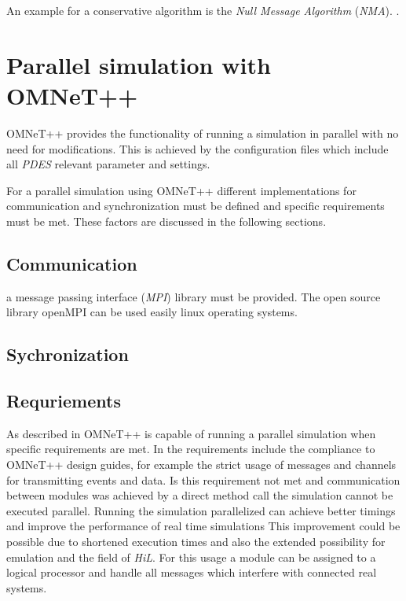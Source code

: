 An example for a conservative algorithm is the \emph{Null Message Algorithm} (\emph{NMA}). \cite[section 2.1]{bagrodia_performance_2000} \cite{Varga03apractical}.

\section{Parallel simulation with OMNeT++}
\label{sec:parallel_omnet}

OMNeT++ provides the functionality of running a simulation in parallel with no need for modifications.
This is achieved by the configuration files which include all \emph{PDES} relevant parameter and settings.

For a parallel simulation using OMNeT++ different implementations for communication and synchronization must be defined and specific requirements must be met.
These factors are discussed in the following sections.

\subsection{Communication}
\label{sec:parallel_omnet_comm}

a message passing interface (\emph{MPI}) library must be provided.
The open source library openMPI can be used easily linux operating systems.


\subsection{Sychronization}
\label{sec:parallel_omnet_sync}

\subsection{Requriements}
\label{sec:parallel_omnet_requirements}

As described in \cite{varga_parallel_2003} OMNeT++ is capable of running a parallel simulation when specific requirements are met.
In \cite{varga_parallel_2003} the requirements include the compliance to OMNeT++ design guides, for example the strict usage of messages and channels for transmitting events and data.
Is this requirement not met and communication between modules was achieved by a direct method call the simulation cannot be executed parallel.
Running the simulation parallelized can achieve better timings and improve the performance of real time simulations
This improvement could be possible due to shortened execution times and also the extended possibility for emulation and the field of \emph{HiL}.
For this usage a module can be assigned to a logical processor and handle all messages which interfere with connected real systems.